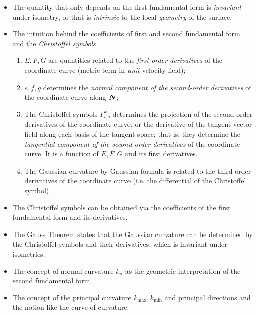 \documentclass[11pt]{article}
\begin{document}
\begin{itemize}
\item The quantity that only depends on the first fundamental form is \emph{invariant} under isometry, or that is \emph{intrinsic} to the local \emph{geometry} of the surface.\\

\item  The intuition behind the coefficients of first and second fundamental form and the \emph{Christoffel symbols}
\begin{enumerate}
\item $E,F,G$ are quantities related to the \emph{first-order derivatives} of the coordinate curve (metric term in \emph{unit} velocity field);

\item $e,f,g$ determines the \emph{normal component of the second-order derivatives} of the coordinate curve along $\boldsymbol{N}$;

\item The Christoffel symbols  $\Gamma_{i,j}^{k}$ determines  the projection of the second-order derivatives of the coordinate curve, or the derivative of the tangent vector field along each basis of the tangent space; that is, they determine the \emph{tangential component of the second-order derivatives} of the coordinate curve. It is a function of $E,F,G$ and its first derivatives. 


\item The Gaussian curvature by Gaussian formula is related to the third-order derivatives of the coordinate curve (i.e. the differential of the Christoffel symbol). 
\end{enumerate}

\item The Christoffel symbols can be obtained via the coefficients of the first fundamental form and its derivatives.  

\item The Gauss Theorem states that the Gaussian curvature can be determined by the Christoffel symbols and their derivatives, which is invariant under isometries. \\[10pt]


\item The concept of normal curvature $k_{n}$ as the geometric interpretation of the second fundamental form. 

\item The concept of the principal curvature $k_{\max}, k_{\min}$ and principal directions and the notion like the curve of curvature. 


\end{itemize}
\end{document}
